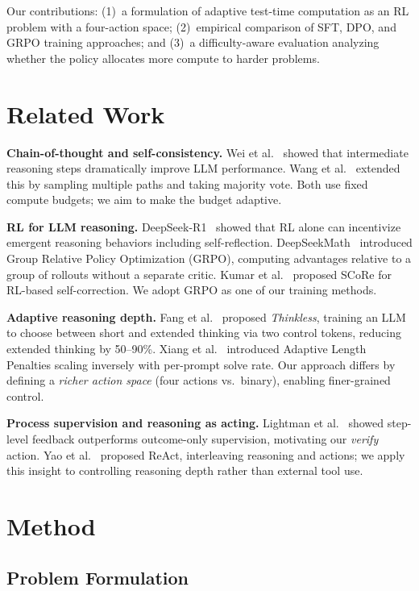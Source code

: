 \documentclass{article}
\begin{document}
Our contributions: (1)~a formulation of adaptive test-time computation as an RL problem with a four-action space; (2)~empirical comparison of SFT, DPO, and GRPO training approaches; and (3)~a difficulty-aware evaluation analyzing whether the policy allocates more compute to harder problems.

\section{Related Work}

\textbf{Chain-of-thought and self-consistency.} Wei et al.~\citep{wei2022chainofthought} showed that intermediate reasoning steps dramatically improve LLM performance. Wang et al.~\citep{wang2023selfconsistency} extended this by sampling multiple paths and taking majority vote. Both use fixed compute budgets; we aim to make the budget adaptive.

\textbf{RL for LLM reasoning.} DeepSeek-R1~\citep{deepseek2025r1} showed that RL alone can incentivize emergent reasoning behaviors including self-reflection. DeepSeekMath~\citep{shao2024deepseekmath} introduced Group Relative Policy Optimization (GRPO), computing advantages relative to a group of rollouts without a separate critic. Kumar et al.~\citep{kumar2025training} proposed SCoRe for RL-based self-correction. We adopt GRPO as one of our training methods.

\textbf{Adaptive reasoning depth.} Fang et al.~\citep{fang2025thinkless} proposed \emph{Thinkless}, training an LLM to choose between short and extended thinking via two control tokens, reducing extended thinking by 50--90\%. Xiang et al.~\citep{xiang2025justenough} introduced Adaptive Length Penalties scaling inversely with per-prompt solve rate. Our approach differs by defining a \emph{richer action space} (four actions vs.\ binary), enabling finer-grained control.

\textbf{Process supervision and reasoning as acting.} Lightman et al.~\citep{lightman2024lets} showed step-level feedback outperforms outcome-only supervision, motivating our \emph{verify} action. Yao et al.~\citep{yao2023react} proposed ReAct, interleaving reasoning and actions; we apply this insight to controlling reasoning depth rather than external tool use.

\section{Method}

\subsection{Problem Formulation}
\end{document}

